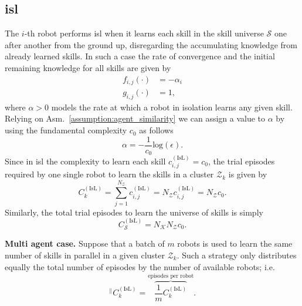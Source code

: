 \subsection{\Acl{isl}} The $i$-th robot performs \ac{isl} when it learns each skill in the skill universe $\mathcal{S}$ one after another from the ground up, disregarding the accumulating knowledge from already learned skills. In such a case the rate of convergence and the initial remaining knowledge for all skills are given by
\begin{subequations}\label{eq:fg_isolated}
	\begin{alignat}{2}
		f_{i,j}\left(\cdot \right) &=  -\alpha_i \\
		g_{i,j}\left(\cdot \right) &= 1,
	\end{alignat}
\end{subequations}
where $ \alpha>0$ models the rate at which a robot in isolation learns any given skill. Relying on Asm.~\ref{assumption:agent_similarity} we can assign a value to $\alpha$ by using the fundamental complexity $c_0$ as follows
\begin{equation}\label{eq:isolated_learning_rate}
	\alpha = -\frac{1}{c_0}\text{log}(\epsilon).
\end{equation}
Since in \ac{isl} the complexity to learn each skill $c^{(\text{IsL})}_{i,j} = c_0$, the trial episodes required by one single robot to learn the skills in a cluster $\mathcal{Z}_k$ is given by
\begin{equation}
	C^{(\text{IsL})}_{k} = \sum_{j=1}^{N_{\mathcal{Z}}} c^{(\text{IsL})}_{i,j}= N_{\mathcal{Z}}  c^{(\text{IsL})}_{i,j} = N_{\mathcal{Z}} c_0.
\end{equation}
Similarly, the total trial episodes to learn the universe of skills is simply
\begin{equation}
	C^{(\text{IsL})}_{\mathcal{S}} = N_\mathcal{K} N_{\mathcal{Z}} c_0.
\end{equation}

\textbf{Multi agent case.} Suppose that a batch of $m$ robots is used to learn the same number of skills in parallel in a given cluster $\mathcal{Z}_k$. Such a strategy only distributes equally the total number of episodes by the number of available robots; i.e.
\begin{equation}
	^{\lvert \lvert}C^{(\text{IsL})}_k=  \overbrace{\frac{1}{m}C^{(\text{IsL})}_k}^{\text{episodes per robot}}.
\end{equation}

